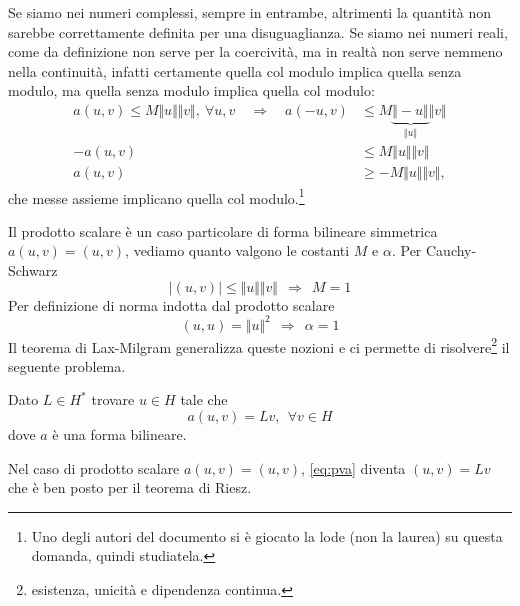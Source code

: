 \documentclass[10pt,a4paper,twoside,openright]{book}
\begin{document}
Se siamo nei numeri complessi, sempre in entrambe, altrimenti la quantità non sarebbe correttamente definita per una disuguaglianza.
Se siamo nei numeri reali, come da definizione non serve per la coercività, ma in realtà non serve nemmeno nella continuità, infatti certamente quella col modulo implica quella senza modulo, ma quella senza modulo implica quella col modulo:
\begin{align*}
	a(u,v)\le M \Vert u \Vert \Vert v \Vert,\ \forall u,v \quad \Rightarrow \quad a(-u,v)& \le  M \underbrace{\Vert -u \Vert}_{\Vert u \Vert} \Vert v \Vert\\
																				 -a(u,v) & \le  M \Vert u \Vert \Vert v \Vert\\
																				  a(u,v) & \ge -M \Vert u \Vert \Vert v \Vert,
\end{align*}
che messe assieme implicano quella col modulo.\footnote{Uno degli autori del documento si è giocato la lode (non la laurea) su questa domanda, quindi studiatela.}

Il prodotto scalare è un caso particolare di forma bilineare simmetrica $a(u,v) =(u,v)$, vediamo quanto valgono le costanti $M$ e $\alpha $. Per Cauchy-Schwarz
\begin{equation*}
	| (u,v)| \leqslant \Vert u\Vert \Vert v\Vert \ \ \Rightarrow \ \ M=1
\end{equation*}
Per definizione di norma indotta dal prodotto scalare
\begin{equation*}
	(u,u) =\Vert u\Vert ^{2} \ \ \Rightarrow \ \ \alpha =1
\end{equation*}
Il teorema di Lax-Milgram generalizza queste nozioni e ci permette di risolvere\footnote{esistenza, unicità e dipendenza continua.} il seguente problema.
\begin{definition}
	 Dato $L\in H^{*}$ trovare $u\in H$ tale che
	\begin{equation}
		\tag{PVA}
		a(u,v) =Lv,\ \ \forall v\in H
		\label{eq:pva}
	\end{equation}
	dove $a$ è una forma bilineare.
\end{definition}
Nel caso di prodotto scalare $a(u,v) =(u,v)$, \eqref{eq:pva} diventa $(u,v) =Lv$ che è ben posto per il teorema di Riesz.
\end{document}
